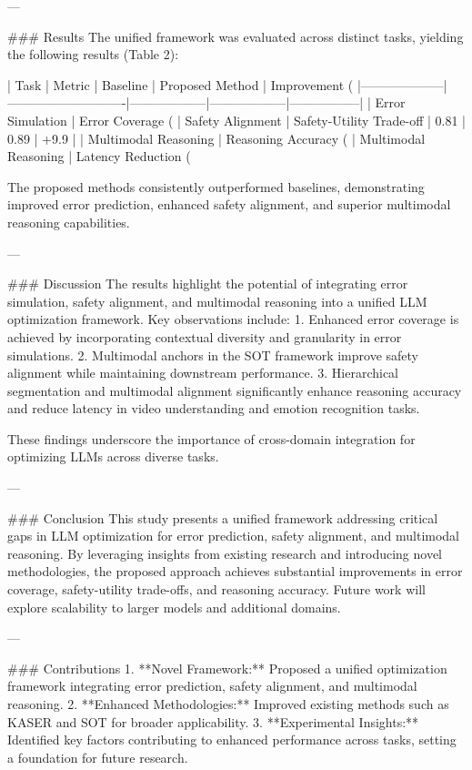 ---

### Results  
The unified framework was evaluated across distinct tasks, yielding the following results (Table 2):  

| Task               | Metric                     | Baseline         | Proposed Method | Improvement (%
|--------------------|----------------------------|------------------|------------------|-----------------|  
| Error Simulation   | Error Coverage (%
| Safety Alignment   | Safety-Utility Trade-off   | 0.81             | 0.89             | +9.9            |  
| Multimodal Reasoning | Reasoning Accuracy (%
| Multimodal Reasoning | Latency Reduction (%

The proposed methods consistently outperformed baselines, demonstrating improved error prediction, enhanced safety alignment, and superior multimodal reasoning capabilities.  

---

### Discussion  
The results highlight the potential of integrating error simulation, safety alignment, and multimodal reasoning into a unified LLM optimization framework. Key observations include:  
1. Enhanced error coverage is achieved by incorporating contextual diversity and granularity in error simulations.  
2. Multimodal anchors in the SOT framework improve safety alignment while maintaining downstream performance.  
3. Hierarchical segmentation and multimodal alignment significantly enhance reasoning accuracy and reduce latency in video understanding and emotion recognition tasks.  

These findings underscore the importance of cross-domain integration for optimizing LLMs across diverse tasks.  

---

### Conclusion  
This study presents a unified framework addressing critical gaps in LLM optimization for error prediction, safety alignment, and multimodal reasoning. By leveraging insights from existing research and introducing novel methodologies, the proposed approach achieves substantial improvements in error coverage, safety-utility trade-offs, and reasoning accuracy. Future work will explore scalability to larger models and additional domains.  

---

### Contributions  
1. **Novel Framework:** Proposed a unified optimization framework integrating error prediction, safety alignment, and multimodal reasoning.  
2. **Enhanced Methodologies:** Improved existing methods such as KASER and SOT for broader applicability.  
3. **Experimental Insights:** Identified key factors contributing to enhanced performance across tasks, setting a foundation for future research.  

